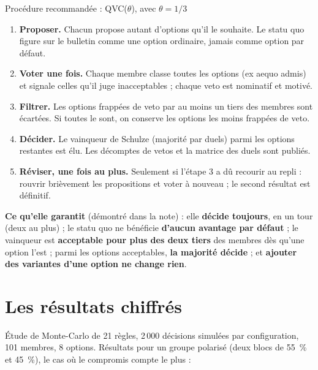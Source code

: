\documentclass[10pt,a4paper]{article}
\begin{document}
\begin{keybox}{Procédure recommandée : QVC($\theta$), avec $\theta = 1/3$}
\begin{enumerate}[label=\textbf{\arabic*.},leftmargin=*]
  \item \textbf{Proposer.} Chacun propose autant d'options qu'il le souhaite. Le statu quo figure sur le
  bulletin comme une option ordinaire, jamais comme option par défaut.
  \item \textbf{Voter une fois.} Chaque membre classe toutes les options (ex aequo admis) et signale
  celles qu'il juge inacceptables ; chaque veto est nominatif et motivé.
  \item \textbf{Filtrer.} Les options frappées de veto par au moins un tiers des membres sont écartées.
  Si toutes le sont, on conserve les options les moins frappées de veto.
  \item \textbf{Décider.} Le vainqueur de Schulze (majorité par duels) parmi les options restantes est
  élu. Les décomptes de vetos et la matrice des duels sont publiés.
  \item \textbf{Réviser, une fois au plus.} Seulement si l'étape 3 a dû recourir au repli : rouvrir
  brièvement les propositions et voter à nouveau ; le second résultat est définitif.
\end{enumerate}
\end{keybox}

\textbf{Ce qu'elle garantit} (démontré dans la note) : elle \textbf{décide toujours}, en un tour (deux
au plus) ; le statu quo ne bénéficie \textbf{d'aucun avantage par défaut} ; le vainqueur est
\textbf{acceptable pour plus des deux tiers} des membres dès qu'une option l'est ; parmi les options
acceptables, \textbf{la majorité décide} ; et \textbf{ajouter des variantes d'une option ne change rien}.

\section{Les résultats chiffrés}
Étude de Monte-Carlo de 21 règles, 2\,000 décisions simulées par configuration, 101 membres, 8 options.
Résultats pour un groupe polarisé (deux blocs de 55~\% et 45~\%), le cas où le compromis compte le plus :
\end{document}
